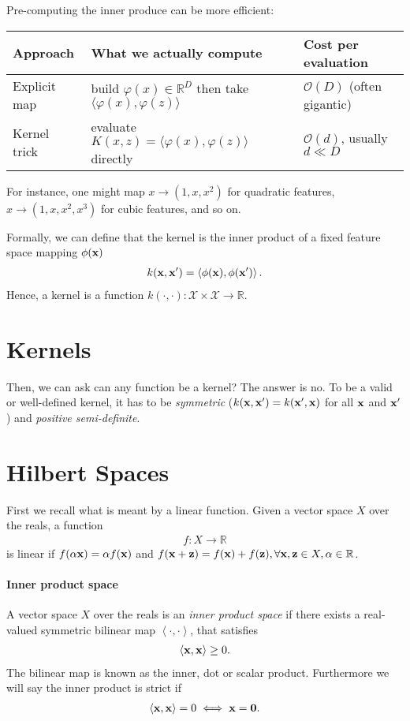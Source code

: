 Pre-computing the inner produce can be more efficient:
\begin{center}
\begin{tabular}{|l|p{5.6cm}|l|}
\hline
\textbf{Approach} & \textbf{What we actually compute} & \textbf{Cost per evaluation}\\
\hline
Explicit map & build $\varphi(x)\in\mathbb{R}^{D}$ then take $\langle\varphi(x),\varphi(z)\rangle$ & $\mathcal{O}(D)$ (often gigantic)\\
Kernel trick & evaluate $K(x,z)=\langle\varphi(x),\varphi(z)\rangle$ directly & $\mathcal{O}(d)$, usually $d\ll D$\\
\hline
\end{tabular}
\end{center}
For instance, one might map $x\to (1, x, x^2)$ for quadratic features, $x\to (1, x, x^2, x^3)$ for cubic features, and so on. 

Formally, we can define that the kernel is the inner product of a fixed feature space mapping $\phi({\mathbf{x}})$
\begin{align*}
	k({\mathbf{x}}, {\mathbf{x}}') = \left<\phi({\mathbf{x}}), \phi({\mathbf{x}}')\right>.
\end{align*}
Hence, a kernel is a function $k(\cdot, \cdot): \mathcal{X} \times \mathcal{X} \to \mathbb{R}$.

\section{Kernels}
Then, we can ask can any function be a kernel? The answer is no. To be a valid or well-defined kernel, it has to be \textit{symmetric} (\ie  $k({\mathbf{x}}, {\mathbf{x}}') = k({\mathbf{x}}', {\mathbf{x}})$ for all ${\mathbf{x}}$ and ${\mathbf{x}}'$) and \textit{positive semi-definite}. 


\section{Hilbert Spaces}

First we recall what is meant by a linear function. Given a vector space $X$ over the reals, a function
\begin{align*}
	f: X\longrightarrow \mathbb{R}
\end{align*}
is linear if $f(\alpha{\mathbf{x}}) = \alpha f({\mathbf{x}})$ and $f({\mathbf{x}}+{\mathbf{z}}) = f({\mathbf{x}})+ f({\mathbf{z}}), \forall {\mathbf{x}},{\mathbf{z}} \in X, \alpha\in \mathbb{R}$. 

\paragraph{Inner product space} A vector space $X$ over the reals  is an \textit{inner product space} if there exists a real-valued symmetric bilinear map $\left<\cdot, \cdot\right>$, that satisfies
\begin{align*}
	\left<{\mathbf{x}},{\mathbf{x}}\right>\geq 0.
\end{align*}
The bilinear map is known as the inner, dot or scalar product. Furthermore we will say the inner product is strict if 
\begin{align*}
	\left<{\mathbf{x}}, {\mathbf{x}}\right>=0 \iff {\mathbf{x}}=\mathbf{0}.
\end{align*}

